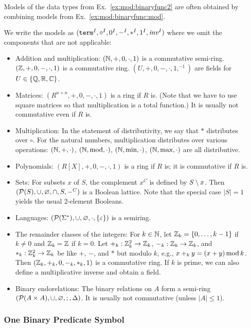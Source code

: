 \begin{example}\label{ex:mod:binaryfunc2:mod}
Models of the data types from Ex.~\ref{ex:mod:binaryfunc2} are often obtained by combining models from Ex.~\ref{ex:mod:binaryfunc:mod}.

We write the models as $(\mathtt{term}^I,\circ^I,0^I,-^I,\ast^I,1^I,\mathit{inv}^I)$ where we omit the components that are not applicable:
\begin{itemize}
\item Addition and multiplication: $(\mathbb{N},+,0,\cdot,1)$ is a commutative semi-ring. $(\mathbb{Z},+,0,-,\cdot,1)$ is a commutative ring. $(U,+,0,-,\cdot,1,^{-1})$ are fields for $U\in\{\mathbb{Q},\mathbb{R},\mathbb{C}\}$.
\item Matrices: $(R^{n\times n},+,0,-,\cdot, 1)$ is a ring if $R$ is. (Note that we have to use square matrices so that multiplication is a total function.) It is usually not commutative even if $R$ is.
\item Multiplication: In the statement of distributivity, we say that $\ast$ distributes over $\circ$.
For the natural numbers, multiplication distributes over various operations: $(\mathbb{N},+,\cdot)$, $(\mathbb{N},\mathrm{mod},\cdot)$, $(\mathbb{N},\min,\cdot)$, $(\mathbb{N},\max,\cdot)$ are all distributive.
\item Polynomials: $(R[X],+,0,-,\cdot,1)$ is a ring if $R$ is; it is commutative if $R$ is.
\item Sets:
For subsets $x$ of $S$, the complement $x^C$ is defined by $S\setminus x$.
Then $(\mathcal{P}(S),\cup,\varnothing,\cap,S,-^C)$ is a Boolean lattice.
  Note that the special case $|S|=1$ yields the usual 2-element Booleans.
\item Languages: $(\mathcal{P}(\Sigma^*),\cup,\varnothing,\cdot,\{\varepsilon\})$ is a semiring.
\item The remainder classes of the integers: For $k\in\mathbb{N}$, let $\mathbb{Z}_k=\{0,\ldots,k-1\}$ if $k\neq 0$ and $\mathbb{Z}_k=\mathbb{Z}$ if $k=0$.
Let $+_k:\mathbb{Z}_k^2\to\mathbb{Z}_k$, $-_k:\mathbb{Z}_k\to\mathbb{Z}_k$, and $*_k:\mathbb{Z}_k^2\to\mathbb{Z}_k$ be like $+$, $-$, and $*$ but modulo $k$, e.g., $x+_k y=(x+y)\mathop{\mathrm{mod}} k$.
Then $(\mathbb{Z}_k,+_k,0,-_k,*_k,1)$ is a commutative ring.
If $k$ is prime, we can also define a multiplicative inverse and obtain a field.
\item Binary endorelations: The binary relations on $A$ form a semi-ring $(\mathcal{P}(A\times A),\cup,\varnothing,;,\Delta)$.
It is usually not commutative (unless $|A|\leq 1$).
\end{itemize}
\end{example}

\subsubsection{One Binary Predicate Symbol}

